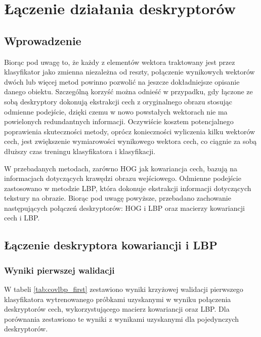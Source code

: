 \chapter{Łączenie działania deskryptorów}
\label{cha:laczenie}

\section{Wprowadzenie}
Biorąc pod uwagę to, że każdy z elementów wektora traktowany jest przez klasyfikator jako zmienna niezależna od reszty, połączenie wynikowych wektorów dwóch lub więcej metod powinno pozwolić na jeszcze dokładniejsze opisanie danego obiektu. Szczególną korzyść można odnieść w przypadku, gdy łączone ze sobą deskryptory dokonują ekstrakcji cech z oryginalnego obrazu stosując odmienne podejście, dzięki czemu w nowo powstałych wektorach nie ma powielonych redundantnych informacji. Oczywiście kosztem potencjalnego poprawienia skuteczności metody, oprócz konieczności wyliczenia kilku wektorów cech, jest zwiększenie wymiarowości wynikowego wektora cech, co ciągnie za sobą dłuższy czas treningu klasyfikatora i klasyfikacji.

W przebadanych metodach, zarówno HOG jak kowariancja cech, bazują na informacjach dotyczących krawędzi obrazu wejściowego. Odmienne podejście zastosowano w metodzie LBP, która dokonuje ekstrakcji informacji dotyczących tekstury na obrazie. Biorąc pod uwagę powyższe, przebadano zachowanie następujących połączeń deskryptorów: HOG i LBP oraz macierzy kowariancji cech i LBP.

\section{Łączenie deskryptora kowariancji i LBP}

\subsection{Wyniki pierwszej walidacji}

W tabeli \ref{tab:covlbp_first} zestawiono wyniki krzyżowej walidacji pierwszego klasyfikatora wytrenowanego 
próbkami uzyskanymi w wyniku połączenia deskryptorów cech, wykorzystującego macierz kowariancji oraz LBP. Dla porównania zestawiono te wyniki z wynikami uzyskanymi dla pojedynczych deskryptorów.

